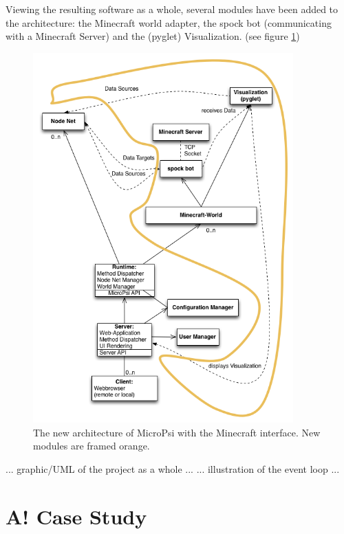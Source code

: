 Viewing the resulting software as a whole, several modules have been added to the architecture: the Minecraft world adapter, the spock bot (communicating with a Minecraft Server) and the (pyglet) Visualization. (see figure \ref{uml_mc})

\begin{figure}[h]
  \centering
    \includegraphics[width=10cm]{graphics/UML_MicroPsi_mit_spock_und_rahmen}
  \caption{The new architecture of MicroPsi with the Minecraft interface. New modules are framed orange.}
  \label{uml_mc}
\end{figure}

... graphic/UML of the project as a whole ...
... illustration of the event loop ...


\section{A! Case Study}

